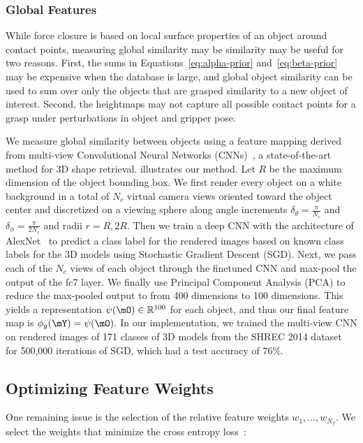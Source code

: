 \subsubsection{Global Features}
While force closure is based on local surface properties of an object around contact points, measuring global similarity may be similarity may be useful for two reasons.
First, the sums in Equations~\ref{eq:alpha-prior} and~\ref{eq:beta-prior} may be expensive when the database is large, and global object similarity can be used to sum over only the objects that are grasped similarity to a new object of interest.
Second, the heightmaps may not capture all possible contact points for a grasp under perturbations in object and gripper pose.

We measure global similarity between objects using a feature mapping derived from multi-view Convolutional Neural Networks (CNNs)~\cite{su2015multi}, a state-of-the-art method for 3D shape retrieval.
 illustrates our method.
Let $R$ be the maximum dimension of the object bounding box.
We first render every object on a white background in a total of $N_c$ virtual camera views oriented toward the object center and discretized on a viewing sphere along angle increments $\delta_{\theta} = \frac{\pi}{N_c}$ and $\delta_{\phi} = \frac{\pi}{2 N_c}$ and radii $r = R, 2R$.
Then we train a deep CNN with the architecture of AlexNet~\cite{krizhevsky2012imagenet} to predict a class label for the rendered images based on known class labels for the 3D models using Stochastic Gradient Descent (SGD).
Next, we pass each of the $N_c$ views of each object through the finetuned CNN and max-pool the output of the fc7 layer.
We finally use Principal Component Analysis (PCA) to reduce the max-pooled output to from 400 dimensions to 100 dimensions.
This yields a representation $\psi(\mO) \in \mathbb{R}^{100}$ for each object, and thus our final feature map is $\phi_{g}(\mY) = \psi(\mO)$.
In our implementation, we trained the multi-view CNN on rendered images of 171 classes of 3D models from the SHREC 2014 dataset ~\cite{li2015comparison} for 500,000 iterations of SGD, which had a test accuracy of 76\%.


\subsection{Optimizing Feature Weights}
One remaining issue is the selection of the relative feature weights $w_1, ..., w_{N_f}$.
We select the weights that minimize the cross entropy loss~\cite{de2005tutorial}:

